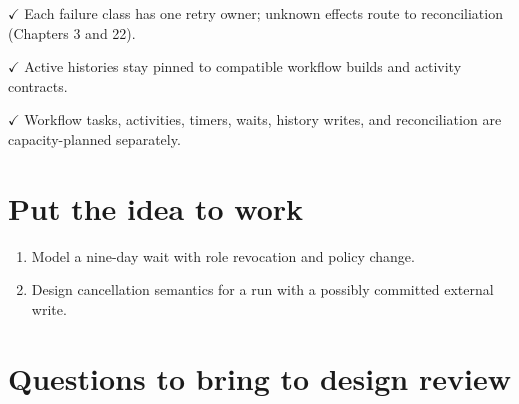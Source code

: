 \textbf{\ensuremath{\checkmark}} Each failure class has one retry owner; unknown effects route to reconciliation (Chapters 3 and 22).\par

\textbf{\ensuremath{\checkmark}} Active histories stay pinned to compatible workflow builds and activity contracts.\par

\textbf{\ensuremath{\checkmark}} Workflow tasks, activities, timers, waits, history writes, and reconciliation are capacity-planned separately.\par

\section{Put the idea to work}

\begin{enumerate}

\item Model a nine-day wait with role revocation and policy change.

\item Design cancellation semantics for a run with a possibly committed external write.

\end{enumerate}

\section{Questions to bring to design review}

